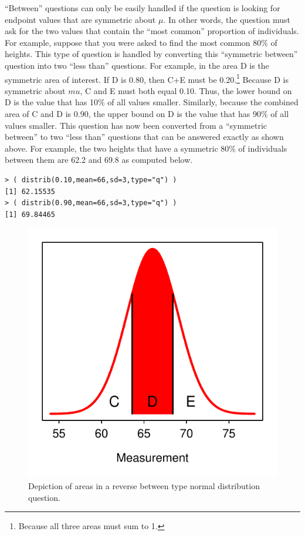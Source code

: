 \documentclass[10pt,openany]{book}\usepackage[]{graphicx}\usepackage[]{color}
\makeatletter
\newenvironment{kframe}{%
 \def\at@end@of@kframe{}%
 \ifinner\ifhmode%
  \def\at@end@of@kframe{\end{minipage}}%
  \begin{minipage}{\columnwidth}%
 \fi\fi%
 \def\FrameCommand##1{\hskip\@totalleftmargin \hskip-\fboxsep
 \colorbox{shadecolor}{##1}\hskip-\fboxsep
     \hskip-\linewidth \hskip-\@totalleftmargin \hskip\columnwidth}%
 \MakeFramed {\advance\hsize-\width
   \@totalleftmargin\z@ \linewidth\hsize
   \@setminipage}}%
 {\par\unskip\endMakeFramed%
 \at@end@of@kframe}
\newenvironment{knitrout}{}{} %
\makeatother
\begin{document}
``Between'' questions can only be easily handled if the question is looking for endpoint values that are symmetric about $\mu$. In other words, the question must ask for the two values that contain the ``most common'' proportion of individuals. For example, suppose that you were asked to find the most common 80\% of heights. This type of question is handled by converting this ``symmetric between'' question into two ``less than'' questions. For example, in  the area D is the symmetric area of interest. If D is 0.80, then C+E must be 0.20.\footnote{Because all three areas must sum to 1.}  Because D is symmetric about $mu$, C and E must both equal 0.10. Thus, the lower bound on D is the value that has 10\% of all values smaller. Similarly, because the combined area of C and D is 0.90, the upper bound on D is the value that has 90\% of all values smaller. This question has now been converted from a ``symmetric between'' to two ``less than'' questions that can be answered exactly as shown above. For example, the two heights that have a symmetric 80\% of individuals between them are 62.2 and 69.8 as computed below.
\begin{knitrout}
\color{fgcolor}\begin{kframe}
\begin{verbatim}
> ( distrib(0.10,mean=66,sd=3,type="q") )
[1] 62.15535
> ( distrib(0.90,mean=66,sd=3,type="q") )
[1] 69.84465
\end{verbatim}
\end{kframe}
\end{knitrout}

\begin{knitrout}
\color{fgcolor}\begin{figure}[hbtp]

{\centering \includegraphics[width=.4\linewidth]{Figs/NormRevBetween-1} 

}

\caption[Depiction of areas in a reverse between type normal distribution question]{Depiction of areas in a reverse between type normal distribution question.}\label{fig:NormRevBetween}
\end{figure}


\end{knitrout}
\end{document}

